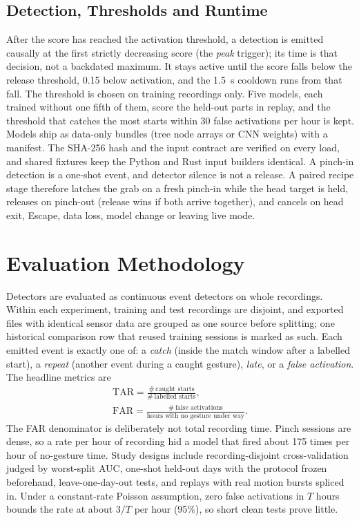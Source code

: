 \subsection{Detection, Thresholds and Runtime}

After the score has reached the activation threshold, a detection is emitted causally at the first strictly decreasing score (the \emph{peak} trigger); its time is that decision, not a backdated maximum. It stays active until the score falls below the release threshold, 0.15 below activation, and the 1.5~s cooldown runs from that fall. The threshold is chosen on training recordings only. Five models, each trained without one fifth of them, score the held-out parts in replay, and the threshold that catches the most starts within 30 false activations per hour is kept. Models ship as data-only bundles (tree node arrays or CNN weights) with a manifest. The SHA-256 hash and the input contract are verified on every load, and shared fixtures keep the Python and Rust input builders identical. A pinch-in detection is a one-shot event, and detector silence is not a release. A paired recipe stage therefore latches the grab on a fresh pinch-in while the head target is held, releases on pinch-out (release wins if both arrive together), and cancels on head exit, Escape, data loss, model change or leaving live mode.

\section{Evaluation Methodology}

Detectors are evaluated as continuous event detectors on whole recordings. Within each experiment, training and test recordings are disjoint, and exported files with identical sensor data are grouped as one source before splitting; one historical comparison row that reused training sessions is marked as such. Each emitted event is exactly one of: a \emph{catch} (inside the match window after a labelled start), a \emph{repeat} (another event during a caught gesture), \emph{late}, or a \emph{false activation}. The headline metrics are
\begin{gather}
  \mathrm{TAR} = \frac{\#\,\text{caught starts}}{\#\,\text{labelled starts}}, \\
  \mathrm{FAR} = \frac{\#\,\text{false activations}}{\text{hours with no gesture under way}}.
\end{gather}
The FAR denominator is deliberately not total recording time. Pinch sessions are dense, so a rate per hour of recording hid a model that fired about 175 times per hour of no-gesture time. Study designs include recording-disjoint cross-validation judged by worst-split AUC, one-shot held-out days with the protocol frozen beforehand, leave-one-day-out tests, and replays with real motion bursts spliced in. Under a constant-rate Poisson assumption, zero false activations in $T$ hours bounds the rate at about $3/T$ per hour (95\%), so short clean tests prove little.

